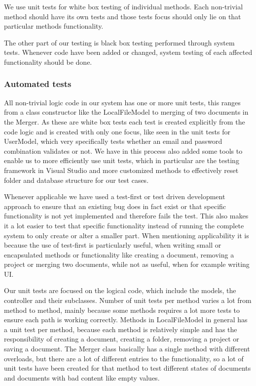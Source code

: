 We use unit tests for white box testing of individual methods. Each non-trivial method should have its own tests and those tests focus should only lie on that particular methods functionality.

The other part of our testing is black box testing performed through system tests. Whenever code have been added or changed, system testing of each affected functionality should be done.

\subsubsection{Automated tests}
All non-trivial logic code in our system has one or more unit tests, this ranges from a class constructor like the LocalFileModel to merging of two documents in the Merger. As these are white box tests each test is created explicitly from the code logic and is created with only one focus, like seen in the unit tests for UserModel, which very specifically tests whether an email and password combination validates or not. We have in this process also added some tools to enable us to more efficiently use unit tests, which in particular are the testing framework in Visual Studio and more customized methods to effectively reset folder and database structure for our test cases.

Whenever applicable we have used a test-first or test driven development approach to ensure that an existing bug does in fact exist or that specific functionality is not yet implemented and therefore fails the test. This also makes it a lot easier to test that specific functionality instead of running the complete system to only create or alter a smaller part. When mentioning applicability it is because the use of test-first is particularly useful, when writing small  or encapsulated methods or functionality like creating a document, removing a project or merging two documents, while not as useful, when for example writing UI.

Our unit tests are focused on the logical code, which include the models, the controller and their subclasses. Number of unit tests per method varies a lot from method to method, mainly because some methods requires a lot more tests to ensure each path is working correctly. Methods in LocalFileModel in general has a unit test per method, because each method is relatively simple and has the responsibility of creating a document, creating a folder, removing a project or saving a document. The Merger class basically has a single method with different overloads, but there are a lot of different entries to the functionality, so a lot of unit tests have been created for that method to test different states of documents and documents with bad content like empty values.

